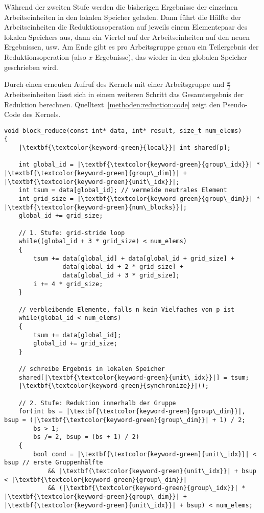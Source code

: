 Während der zweiten Stufe werden die bisherigen Ergebnisse der einzelnen
Arbeitseinheiten in den lokalen Speicher geladen. Dann führt die Hälfte der
Arbeitseinheiten die Reduktionsoperation auf jeweils einem Elementepaar des
lokalen Speichers aus, dann ein Viertel auf der Arbeitseinheiten auf den neuen
Ergebnissen, usw. Am Ende gibt es pro Arbeitsgruppe genau ein Teilergebnis der
Reduktionsoperation (also $x$ Ergebnisse), das wieder in den globalen Speicher
geschrieben wird.

Durch einen erneuten Aufruf des Kernels mit einer Arbeitsgruppe und
$\frac{x}{2}$ Arbeitseinheiten lässt sich in einem weiteren Schritt das
Gesamtergebnis der Reduktion berechnen. Quelltext~\ref{methoden:reduction:code}
zeigt den Pseudo-Code des Kernels.

\begin{code}
    \begin{verbatim}
void block_reduce(const int* data, int* result, size_t num_elems)
{
    |\textbf{\textcolor{keyword-green}{local}}| int shared[p];

    int global_id = |\textbf{\textcolor{keyword-green}{group\_idx}}| * |\textbf{\textcolor{keyword-green}{group\_dim}}| + |\textbf{\textcolor{keyword-green}{unit\_idx}}|;
    int tsum = data[global_id]; // vermeide neutrales Element
    int grid_size = |\textbf{\textcolor{keyword-green}{group\_dim}}| * |\textbf{\textcolor{keyword-green}{num\_blocks}}|;
    global_id += grid_size;

    // 1. Stufe: grid-stride loop
    while((global_id + 3 * grid_size) < num_elems)
    {
        tsum += data[global_id] + data[global_id + grid_size] +
                data[global_id + 2 * grid_size] +
                data[global_id + 3 * grid_size];
        i += 4 * grid_size;
    }

    // verbleibende Elemente, falls n kein Vielfaches von p ist
    while(global_id < num_elems)
    {
        tsum += data[global_id];
        global_id += grid_size;
    }

    // schreibe Ergebnis in lokalen Speicher
    shared[|\textbf{\textcolor{keyword-green}{unit\_idx}}|] = tsum; 
    |\textbf{\textcolor{keyword-green}{synchronize}}|();

    // 2. Stufe: Reduktion innerhalb der Gruppe
    for(int bs = |\textbf{\textcolor{keyword-green}{group\_dim}}|, bsup = (|\textbf{\textcolor{keyword-green}{group\_dim}}| + 1) / 2;
        bs > 1;
        bs /= 2, bsup = (bs + 1) / 2)
    {
        bool cond = |\textbf{\textcolor{keyword-green}{unit\_idx}}| < bsup // erste Gruppenhälfte
            && |\textbf{\textcolor{keyword-green}{unit\_idx}}| + bsup < |\textbf{\textcolor{keyword-green}{group\_dim}}|
            && (|\textbf{\textcolor{keyword-green}{group\_idx}}| * |\textbf{\textcolor{keyword-green}{group\_dim}}| + |\textbf{\textcolor{keyword-green}{unit\_idx}}| + bsup) < num_elems;


\end{verbatim}
\end{code}
